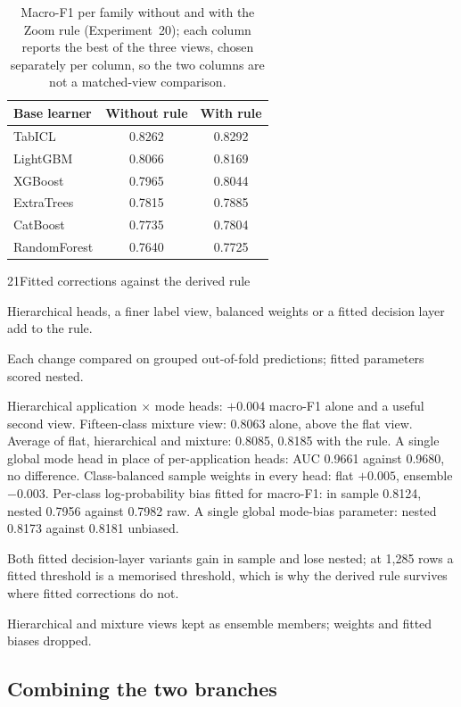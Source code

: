 \begin{table}[t]
\caption{Macro-F1 per family without and with the Zoom rule (Experiment~20); each
column reports the best of the three views, chosen separately per column, so the
two columns are not a matched-view comparison.}
\label{tab:t3-rule}
\centering
\begin{tabular}{lcc}
\hline
Base learner & Without rule & With rule \\
\hline
TabICL & 0.8262 & 0.8292 \\
LightGBM & 0.8066 & 0.8169 \\
XGBoost & 0.7965 & 0.8044 \\
ExtraTrees & 0.7815 & 0.7885 \\
CatBoost & 0.7735 & 0.7804 \\
RandomForest & 0.7640 & 0.7725 \\
\hline
\end{tabular}
\end{table}
 
\begin{explog}{21}{Fitted corrections against the derived rule}
\item[Hypothesis] Hierarchical heads, a finer label view, balanced weights or a fitted decision
layer add to the rule.
\item[Method] Each change compared on grouped out-of-fold predictions; fitted parameters
scored nested.
\item[Result] Hierarchical application $\times$ mode heads: $+0.004$ macro-F1 alone and a
useful second view. Fifteen-class mixture view: 0.8063 alone, above the flat view.
Average of flat, hierarchical and mixture: 0.8085, 0.8185 with the rule. A single
global mode head in place of per-application heads: AUC 0.9661 against 0.9680, no
difference. Class-balanced sample weights in every head: flat $+0.005$, ensemble
$-0.003$. Per-class log-probability bias fitted for macro-F1: in sample 0.8124,
nested 0.7956 against 0.7982 raw. A single global mode-bias parameter: nested 0.8173
against 0.8181 unbiased.
\item[Inference] Both fitted decision-layer variants gain in sample and lose nested; at 1{,}285
rows a fitted threshold is a memorised threshold, which is why the derived rule
survives where fitted corrections do not.
\item[Verdict] Hierarchical and mixture views kept as ensemble members; weights and
fitted biases dropped.
\end{explog}

\subsection{Combining the two branches}

